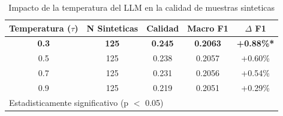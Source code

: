 \begin{table}[h]
\centering
\caption{Impacto de la temperatura del LLM en la calidad de muestras sinteticas}
\label{tab:temperature_validation}
\begin{tabular}{ccccc}
\hline
Temperatura ($\tau$) & N Sinteticas & Calidad & Macro F1 & $\Delta$ F1 \\
\hline
\textbf{0.3} & \textbf{125} & \textbf{0.245} & \textbf{0.2063} & \textbf{+0.88\%*} \\
0.5 & 125 & 0.238 & 0.2057 & +0.60\% \\
0.7 & 125 & 0.231 & 0.2056 & +0.54\% \\
0.9 & 125 & 0.219 & 0.2051 & +0.29\% \\
\hline
\multicolumn{5}{l}{\footnotesize *Estadisticamente significativo (p $<$ 0.05)} \\
\end{tabular}
\end{table}
